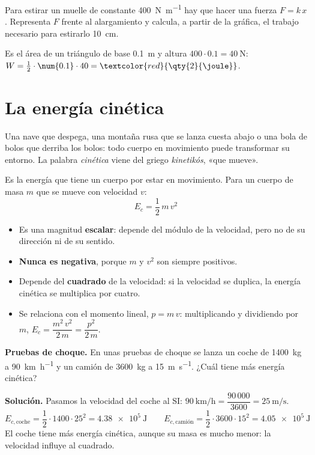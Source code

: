 \begin{exercise}
    Para estirar un muelle de constante \qty{400}{\newton\per\m} hay que hacer una fuerza \(F = k\,x\). Representa \(F\) frente al
    alargamiento y calcula, a partir de la gráfica, el trabajo necesario para estirarlo \qty{10}{\cm}.
    \begin{solu}
        Es el área de un triángulo de base \qty{0.1}{\m} y altura \(400 \cdot \num{0.1} = \qty{40}{\newton}\):
        \(W = \frac{1}{2} \cdot \num{0.1} \cdot 40 = \textcolor{red}{\qty{2}{\joule}}\).
    \end{solu}
\end{exercise}

\section{La energía cinética}\label{sec:ud12-cinetica}

Una nave que despega, una montaña rusa que se lanza cuesta abajo o una bola de bolos que derriba los bolos: todo cuerpo en movimiento
puede transformar su entorno. La palabra \textit{cinética} viene del griego \textit{kinetikós}, «que mueve».

\begin{definition}
    Es la energía que tiene un cuerpo por estar en movimiento. Para un cuerpo de masa \(m\) que se mueve con velocidad \(v\):
    \[ E_c = \frac{1}{2}\,m\,v^2 \]
\end{definition}

\begin{itemize}
    \item Es una magnitud \textbf{escalar}: depende del módulo de la velocidad, pero no de su dirección ni de su sentido.
    \item \textbf{Nunca es negativa}, porque \(m\) y \(v^2\) son siempre positivos.
    \item Depende del \textbf{cuadrado} de la velocidad: si la velocidad se duplica, la energía cinética se multiplica por cuatro.
    \item Se relaciona con el momento lineal, \(p = m\,v\): multiplicando y dividiendo por \(m\), \(E_c = \dfrac{m^2\,v^2}{2\,m} = \dfrac{p^2}{2\,m}\).
\end{itemize}

\begin{example}
    \textbf{Pruebas de choque.} En unas pruebas de choque se lanza un coche de \qty{1400}{\kg} a \qty{90}{\km\per\hour} y un camión de
    \qty{3600}{\kg} a \qty{15}{\m\per\s}. ¿Cuál tiene más energía cinética?

    \textbf{Solución.} Pasamos la velocidad del coche al SI: \(\qty{90}{\km\per\hour} = \dfrac{90\,000}{3600} = \qty{25}{\m\per\s}\).
    \[ E_{c,\text{coche}} = \frac{1}{2} \cdot 1400 \cdot 25^2 = \qty{4.38e5}{\joule} \qquad
    E_{c,\text{camión}} = \frac{1}{2} \cdot 3600 \cdot 15^2 = \qty{4.05e5}{\joule} \]
    El coche tiene más energía cinética, aunque su masa es mucho menor: la velocidad influye al cuadrado.
\end{example}

